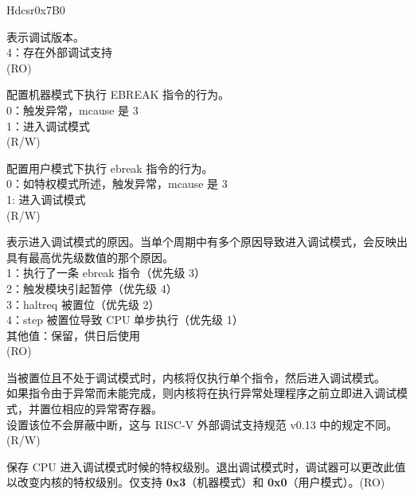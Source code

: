 \begin{register}{H}{dcsr}{0x7B0}\label{regdesc:LPDCSR}
%
%
%
%
%
%
%
%
%
%
\regnewline%
\begin{regdesc}\begin{reglist}
\label{xdebugver}\item [xdebugver] 表示调试版本。\\
4：存在外部调试支持\\
(RO)
\label{ebreakm}\item [ebreakm] 配置机器模式下执行 EBREAK 指令的行为。\\
0：触发异常，mcause 是 3\\
1：进入调试模式\\
(R/W)
\label{ebreaku}\item [ebreaku] 配置用户模式下执行 ebreak 指令的行为。\\
0：如特权模式所述，触发异常，mcause 是 3\\
1: 进入调试模式\\
(R/W)
\label{cause}\item [cause] 表示进入调试模式的原因。当单个周期中有多个原因导致进入调试模式，会反映出具有最高优先级数值的那个原因。\\
1：执行了一条 ebreak 指令（优先级 3）\\
2：触发模块引起暂停（优先级 4）\\
3：haltreq 被置位（优先级 2）\\
4：step 被置位导致 CPU 单步执行（优先级 1）\\
其他值：保留，供日后使用\\
(RO)
\label{step}\item [step] 当被置位且不处于调试模式时，内核将仅执行单个指令，然后进入调试模式。\\
如果指令由于异常而未能完成，则内核将在执行异常处理程序之前立即进入调试模式，并置位相应的异常寄存器。\\
设置该位不会屏蔽中断，这与 RISC-V 外部调试支持规范 v0.13 中的规定不同。\\(R/W)
\label{prv}\item [prv] 保存 CPU 进入调试模式时候的特权级别。退出调试模式时，调试器可以更改此值以改变内核的特权级别。仅支持 \textbf{0x3}（机器模式）和 \textbf{0x0}（用户模式）。(RO)
\end{reglist}\end{regdesc}
\end{register}

